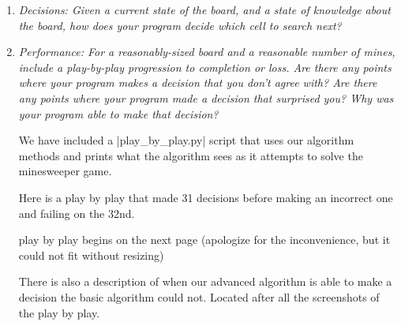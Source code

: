 \documentclass[12pt, twoside]{article}
\begin{document}
\begin{enumerate}[itemsep=2mm,parsep=4mm]
        \vfill
        \pagebreak
    
    \item 
        \textit{Decisions: Given a current state of the board, and a state of knowledge about the board, how does  your program decide which cell to search next?}

        \vfill
        \pagebreak

    \item 
        \textit{Performance: For a reasonably-sized board and a reasonable number of mines, include a play-by-play progression to completion or loss. Are there any points where your program makes a decision that you don’t agree with? Are there any points where your program made a decision that surprised you?  Why was your program able to make that decision?}

        We have included a \cverb|play_by_play.py| script that uses our algorithm methods and prints what the algorithm sees as it attempts to solve the minesweeper game.

        Here is a play by play that made 31 decisions before making an incorrect one and failing on the 32nd.

        play by play begins on the next page (apologize for the inconvenience, but it could not fit without resizing)

        There is also a description of when our advanced algorithm is able to make a decision the basic algorithm could not. Located after all the screenshots of the play by play.


\end{enumerate}
\end{document}
